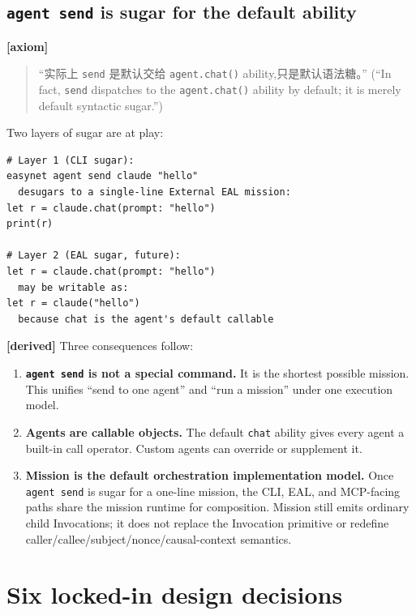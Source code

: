 \documentclass[11pt,a4paper]{article}
\newcommand{\axiom}{\textcolor{axiomcolor}{\textbf{[axiom]}}\xspace}
\newcommand{\derived}{\textcolor{derivedcolor}{\textbf{[derived]}}\xspace}
\begin{document}
\subsection{\texttt{agent send} is sugar for the default ability}

\axiom{}
\begin{quote}
``实际上 \texttt{send} 是默认交给 \texttt{agent.chat()} ability,只是默认语法糖。''
(``In fact, \texttt{send} dispatches to the \texttt{agent.chat()} ability by
default; it is merely default syntactic sugar.'')
\end{quote}

Two layers of sugar are at play:

\begin{lstlisting}
# Layer 1 (CLI sugar):
easynet agent send claude "hello"
  desugars to a single-line External EAL mission:
let r = claude.chat(prompt: "hello")
print(r)

# Layer 2 (EAL sugar, future):
let r = claude.chat(prompt: "hello")
  may be writable as:
let r = claude("hello")
  because chat is the agent's default callable
\end{lstlisting}

\derived{} Three consequences follow:

\begin{enumerate}[leftmargin=2em,itemsep=0.3em]
    \item \textbf{\texttt{agent send} is not a special command.} It is the
    shortest possible mission. This unifies ``send to one agent'' and ``run a
    mission'' under one execution model.
    \item \textbf{Agents are callable objects.} The default \texttt{chat}
    ability gives every agent a built-in call operator. Custom agents can
    override or supplement it.
    \item \textbf{Mission is the default orchestration implementation model.}
    Once \texttt{agent send} is sugar for a one-line mission, the CLI, EAL, and
    MCP-facing paths share the mission runtime for composition. Mission still
    emits ordinary child Invocations; it does not replace the Invocation
    primitive or redefine caller/callee/subject/nonce/causal-context semantics.
\end{enumerate}

\section{Six locked-in design decisions}
\label{sec:six-decisions}
\end{document}
